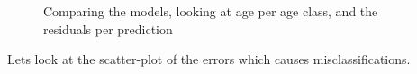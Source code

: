 \documentclass[10pt,letterpaper]{article}
\begin{document}
\begin{figure}
  \caption{\label{ref_label_overall}Comparing the models, looking at age per age class, and the residuals per prediction}
\end{figure}

Lets look at the scatter-plot of the errors which causes misclassifications.
\end{document}
